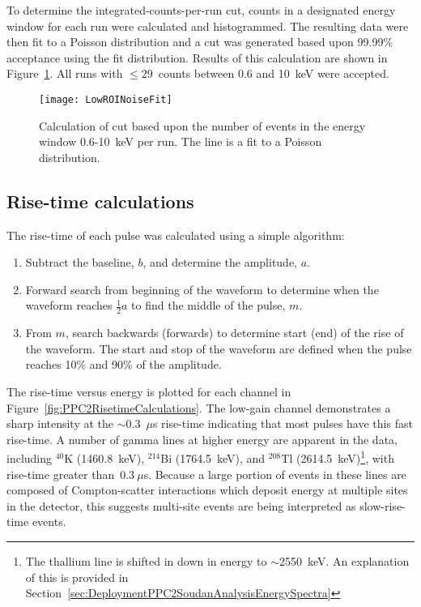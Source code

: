 	To determine the integrated-counts-per-run cut, counts in a designated energy window for each run were calculated and histogrammed.  The resulting data were then fit to a Poisson distribution and a cut was generated based upon 99.99\% acceptance using the fit distribution.  Results of this calculation are shown in Figure~\ref{fig:PPC2NoiseCuts}.  All runs with $\leq29$~counts between 0.6 and 10~keV were accepted.  
	
				\begin{figure}
					\centering
					\texttt{[image: LowROINoiseFit]}
					\caption{Calculation of cut based upon the number of events in the energy window 0.6-10~keV per run.  
					The line is a fit to a Poisson distribution.  }
					\label{fig:PPC2NoiseCuts}
				\end{figure}
	
	    	\subsection{Rise-time calculations}
		\label{sec:DeploymentPPC2SoudanAnalysisRisetime}    
			
	The rise-time of each pulse was calculated using a simple algorithm: 
				\begin{enumerate}
					\item Subtract the baseline, $b$, and determine the amplitude, $a$.
					\item Forward search from beginning of the waveform to determine when the waveform reaches $\frac{1}{2}a$ to find the middle of the pulse, $m$.
					\item From $m$, search backwards (forwards) to determine start (end) of the rise of the waveform.  
					The start and stop of the waveform are defined when the pulse reaches 10\% and 90\% of the amplitude.
				\end{enumerate}
The rise-time versus energy is plotted for each channel in Figure~\ref{fig:PPC2RisetimeCalculations}.  The low-gain channel demonstrates a sharp intensity at the $\sim$0.3~$\mu$s rise-time indicating that most pulses have this fast rise-time.  A number of gamma lines at higher energy are apparent in the data, including $^{40}$K (1460.8~keV), $^{214}$Bi (1764.5~keV), and $^{208}$Tl (2614.5~keV)\footnote{The thallium line is shifted in down in energy to $\sim$2550~keV.  An explanation of this is provided in Section~\ref{sec:DeploymentPPC2SoudanAnalysisEnergySpectra}}, with rise-time greater than~$0.3~\mu$s.  Because a large portion of events in these lines are composed of Compton-scatter interactions which deposit energy at multiple sites in the detector, this suggests multi-site events are being interpreted as slow-rise-time events.  
	
